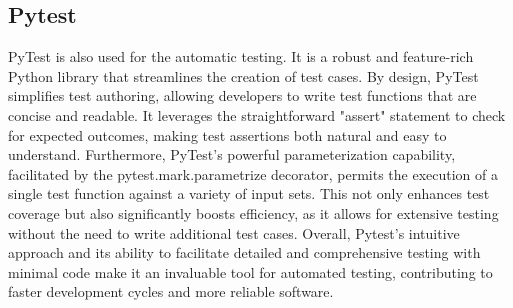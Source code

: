 \documentclass[12pt, titlepage]{article}
\begin{document}
\subsection{Pytest}
PyTest is also used for the automatic testing. It is a robust and feature-rich
Python library that streamlines the creation of test cases. By design, PyTest
simplifies test authoring, allowing developers to write test functions that are
concise and readable. It leverages the straightforward "assert" statement to
check for expected outcomes, making test assertions both natural and easy to
understand. Furthermore, PyTest's powerful parameterization capability,
facilitated by the pytest.mark.parametrize decorator, permits the execution of a
single test function against a variety of input sets. This not only enhances
test coverage but also significantly boosts efficiency, as it allows for
extensive testing without the need to write additional test cases. Overall,
Pytest's intuitive approach and its ability to facilitate detailed and
comprehensive testing with minimal code make it an invaluable tool for automated
testing, contributing to faster development cycles and more reliable software.

\newpage{}
\end{document}
